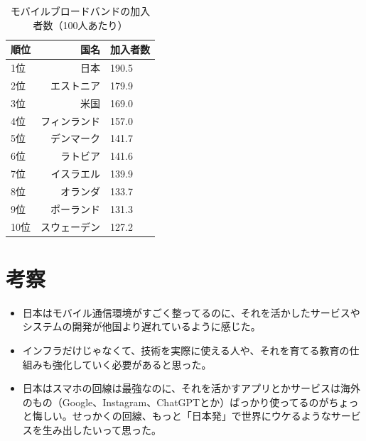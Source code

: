 \documentclass[a4paper,11pt,dvipdfmx]{ujarticle}
\begin{document}
\begin{table}[htbp]
    \centering
    \caption{モバイルブロードバンドの加入者数（100人あたり）}
    \label{tbl:加入者数}

    \begin{tabular}{|l|r|l|}\hline
        順位 & 国名 & 加入者数 \\
        \hline
        1位 & 日本 & 190.5 \\
        \hline
        2位 & エストニア & 179.9 \\
        \hline
        3位 & 米国 & 169.0 \\
        \hline
        4位 & フィンランド & 157.0 \\
        \hline
        5位 & デンマーク & 141.7 \\
        \hline
        6位 & ラトビア & 141.6 \\
        \hline 
        7位 & イスラエル & 139.9 \\
        \hline
        8位 & オランダ & 133.7 \\
        \hline
        9位 & ポーランド & 131.3 \\
        \hline
        10位 & スウェーデン & 127.2 \\
        \hline
    \end{tabular}
\end{table}

\section{考察}
\begin{itemize}
  \item 日本はモバイル通信環境がすごく整ってるのに、それを活かしたサービスやシステムの開発が他国より遅れているように感じた。
  \item インフラだけじゃなくて、技術を実際に使える人や、それを育てる教育の仕組みも強化していく必要があると思った。
  \item 日本はスマホの回線は最強なのに、それを活かすアプリとかサービスは海外のもの（Google、Instagram、ChatGPTとか）ばっかり使ってるのがちょっと悔しい。せっかくの回線、もっと「日本発」で世界にウケるようなサービスを生み出したいって思った。
\end{itemize}

  

\end{document}
